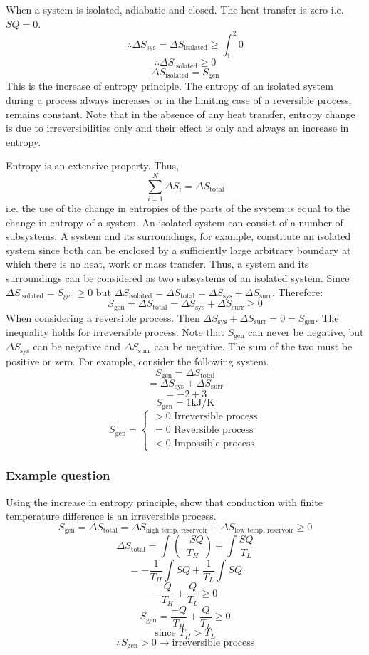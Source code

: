 \documentclass[class=report, crop=false, 12pt,a4paper]{standalone}
\begin{document}
When a system is isolated, adiabatic and closed. The heat transfer is zero i.e. \(SQ = 0\).
\[ \therefore \Delta S_{\textrm{sys}} = \Delta S_{\textrm{isolated}} \geq \int_1^2 0 \]
\[ \therefore \Delta S_{\textrm{isolated}} \geq 0 \]
\[ \Delta S_{\textrm{isolated}} = S_{\textrm{gen}} \]
This is the increase of entropy principle. The entropy of an isolated system during a process always increases or in the limiting case of a reversible process, remains constant. Note that in the absence of any heat transfer, entropy change is due to irreversibilities only and their effect is only and always an increase in entropy.

Entropy is an extensive property. Thus, 
\[ \sum^N_{i=1} \Delta S_i = \Delta S_{\textrm{total}} \]
i.e. the use of the change in entropies of the parts of the system is equal to the change in entropy of a system. An isolated system can consist of a number of subsystems. A system and its surroundings, for example, constitute an isolated system since both can be enclosed by a sufficiently large arbitrary boundary at which there is no heat, work or mass transfer. Thus, a system and its surroundings can be considered as two subsystems of an isolated system. Since \( \Delta S_{\textrm{isolated}} = S_{\textrm{gen}} \geq 0 \) but \( \Delta S_{\textrm{isolated}} = \Delta S_{\textrm{total}} = \Delta S_{\textrm{sys}} + \Delta S_{\textrm{surr}} \). Therefore:
\[ S_{\textrm{gen}} = \Delta S_{\textrm{total}} = \Delta S_{\textrm{sys}} + \Delta S_{\textrm{surr}} \geq 0 \]
When considering a reversible process. Then \( \Delta S_{\textrm{sys}} + \Delta S_{\textrm{surr}} = 0 = S_{\textrm{gen}} \). The inequality holds for irreversible process. Note that \( S_{\textrm{gen}}\) can never be negative, but \( \Delta S_{\textrm{sys}} \) can be negative and \( \Delta S_{\textrm{surr}} \) can be negative. The sum of the two must be positive or zero. For example, consider the following system. 
\[ S_{\textrm{gen}} = \Delta S_{\textrm{total}} \]
\[ = \Delta S_{\textrm{sys}} + \Delta S_{\textrm{surr}}\]
\[ = -2 + 3 \]
\[ S_{\textrm{gen}} = 1 \si{\kilo\joule\per\kelvin} \]
\[ S_{\textrm{gen}} = \begin{cases}
  > 0 \textrm{ Irreversible process}\\
  = 0 \textrm{ Reversible process}\\
  < 0 \textrm{ Impossible process}
\end{cases}
\]
\subsubsection{Example question}
Using the increase in entropy principle, show that conduction with finite temperature difference is an irreversible process. 
\[ S_{\textrm{gen}} = \Delta S_{\textrm{total}} = \Delta S_{\textrm{high temp. reservoir}} + \Delta S_{\textrm{low temp. reservoir}} \geq 0\]
\[ \Delta S_{\textrm{total}} = \int \left( \frac{-SQ}{T_H} \right) + \int \frac{SQ}{T_L} \]
\[ = -\frac{1}{T_H} \int SQ + \frac{1}{T_L} \int SQ \]
\[ -\frac{Q}{T_H} + \frac{Q}{T_L} \geq 0 \]
\[ S_{\textrm{gen}} = \frac{-Q}{T_H} + \frac{Q}{T_L} \geq 0 \]
\[ \textrm{since } T_H > T_L \]
\[ \therefore S_{\textrm{gen}} > 0 \rightarrow \textrm{irreversible process} \]
\end{document}
